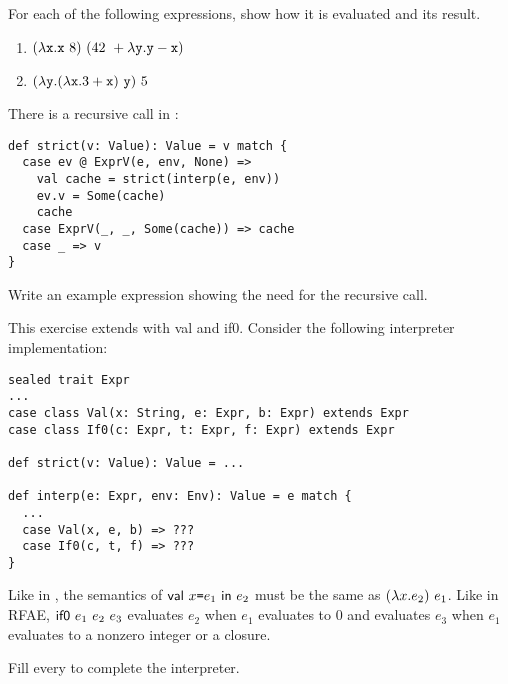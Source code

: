 \begin{exercise}

For each of the following \lang expressions, show how it is evaluated and its result.

\begin{enumerate}
  \item
    $(\lambda\texttt{x}.\texttt{x}\ 8)\ (42\ +\lambda\texttt{y}.\texttt{y}-\texttt{x})$
  \item
    $(\lambda\texttt{y}.(\lambda\texttt{x}.3+\texttt{x})\ \texttt{y})\ 5$
\end{enumerate}

\end{exercise}

\begin{exercise}

There is a recursive call in :

\begin{verbatim}
def strict(v: Value): Value = v match {
  case ev @ ExprV(e, env, None) =>
    val cache = strict(interp(e, env))
    ev.v = Some(cache)
    cache
  case ExprV(_, _, Some(cache)) => cache
  case _ => v
}
\end{verbatim}

Write an example \lang expression showing the need for the recursive  call.

\end{exercise}

\begin{exercise}

This exercise extends \lang with \textsf{val} and \textsf{if0}.  Consider
the following interpreter implementation:

\begin{verbatim}
sealed trait Expr
...
case class Val(x: String, e: Expr, b: Expr) extends Expr
case class If0(c: Expr, t: Expr, f: Expr) extends Expr

def strict(v: Value): Value = ...

def interp(e: Expr, env: Env): Value = e match {
  ...
  case Val(x, e, b) => ???
  case If0(c, t, f) => ???
}
\end{verbatim}

Like in \plang, the semantics of $\textsf{val}\ x\texttt{=} e_1\ \textsf{in}\ e_2$ must be the same as
$(\lambda x.e_2)\ e_1$.  Like in \textsf{RFAE}, $\textsf{if0}\ e_1\ e_2\ e_3$
evaluates $e_2$ when $e_1$ evaluates to $0$ and evaluates $e_3$ when $e_1$
evaluates to a nonzero integer or a closure.

Fill every  to complete the interpreter.

\end{exercise}

